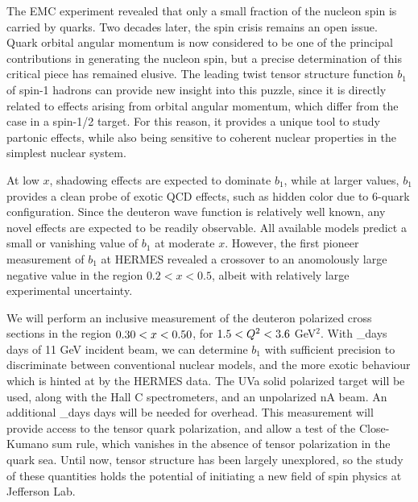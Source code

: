 The EMC experiment revealed that only a small fraction
of the nucleon spin is carried by quarks.
Two decades later, the spin crisis remains an open issue. 
Quark orbital angular momentum is now considered to be one of the principal 
contributions in generating the nucleon spin, but a precise determination of this
critical piece has remained elusive. The leading twist tensor structure function
$b_1$ of spin-1 hadrons 
can provide 
new insight into this puzzle, since it is directly related to effects arising from 
orbital angular momentum, which differ from the case in a spin-1/2 target.
For this reason, it provides a unique tool to study partonic effects, while also being sensitive to 
coherent nuclear properties in the simplest nuclear system.



At low $x$, shadowing effects are expected to dominate $b_1$, 
while at larger values, $b_1$ provides a clean probe of exotic QCD effects, such as
hidden color due to 6-quark configuration. Since the 
deuteron wave function is relatively well known, any novel effects are expected to be
readily observable.  All available models  predict a small or vanishing value of $b_1$ at moderate $x$.  However, the
first pioneer measurement of $b_1$ at HERMES revealed a crossover to an anomolously large negative value in the region $0.2 <x<0.5$, albeit with relatively large experimental uncertainty.  

We will perform an inclusive measurement of the deuteron polarized cross sections in the
region $0.30<x<0.50$, for $1.5<Q^2<3.6$ GeV$^2$.
With \production_days days of 11 GeV incident beam,  we can determine $b_1$ with sufficient 
precision to discriminate between conventional nuclear models, and the more exotic behaviour
which is hinted at by the HERMES data.
The UVa solid polarized \TARGET target will be used, along with the 
Hall C spectrometers, and an unpolarized  \CURRENT nA beam.
An additional \overhead_days days will be needed for overhead.
This measurement  will provide access to the tensor quark polarization, and allow a test of the 
Close-Kumano sum rule, which vanishes in the absence of tensor polarization in the quark 
sea. 
Until now, tensor structure has been largely unexplored, so the study 
of these quantities holds the potential of initiating a new field of spin physics at 
Jefferson Lab.







